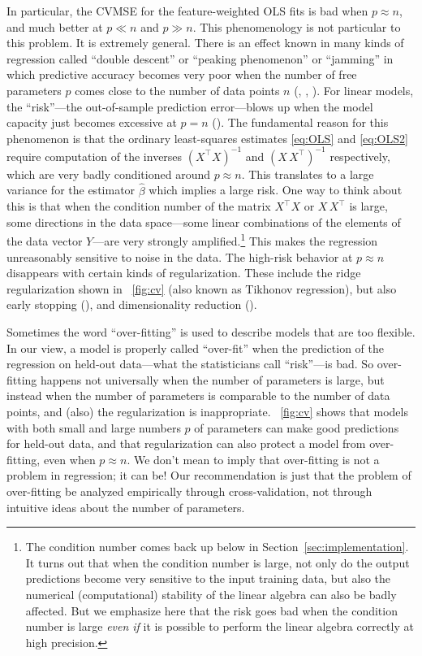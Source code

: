 \documentclass[12pt,letterpaper]{article}
\newcommand{\sectionname}{Section}
\begin{document}
In particular, the CVMSE for the feature-weighted OLS fits is bad when $p\approx n$, and much better at $p\ll n$ and $p \gg n$.
This phenomenology is not particular to this problem.
It is extremely general.
There is an effect known in many kinds of regression called ``double descent'' or ``peaking phenomenon'' or ``jamming'' in which predictive accuracy becomes very poor when the number of free parameters $p$ comes close to the number of data points $n$ (\citealt{jain198239}, \citealt{spigler2018jamming}, \citealt{geiger2019jamming}). For linear models, the ``risk''---the out-of-sample prediction error---blows up when the model capacity just becomes excessive at $p=n$ (\citealt{hastie2019surprises}).
The fundamental reason for this phenomenon is that the ordinary least-squares estimates \eqref{eq:OLS} and \eqref{eq:OLS2} require computation of the inverses $(X^\top X)^{-1}$ and $(X\,X^\top)^{-1}$ respectively, which are very badly conditioned around $p\approx n$.
This translates to a large variance for the estimator $\hat \beta$ which implies a large risk.
One way to think about this is that when the condition number of the matrix $X^\top X$ or $X\,X^\top$ is large, some directions in the data space---some linear combinations of the elements of the data vector $Y$---are very strongly amplified.\footnote{The condition number comes back up below in \sectionname~\ref{sec:implementation}. It turns out that when the condition number is large, not only do the output predictions become very sensitive to the input training data, but also the numerical (computational) stability of the linear algebra can also be badly affected. But we emphasize here that the risk goes bad when the condition number is large \emph{even if} it is possible to perform the linear algebra correctly at high precision.}
This makes the regression unreasonably sensitive to noise in the data.
The high-risk behavior at $p\approx n$ disappears with certain kinds of regularization.
These include the ridge regularization shown in \figurename~\ref{fig:cv} (also known as Tikhonov regression), but also early stopping (\citealt{hastie2019surprises}), and dimensionality reduction (\citealt{huang2020dimensionality}).

Sometimes the word ``over-fitting'' is used to describe models that are too flexible.
In our view, a model is properly called ``over-fit'' when the prediction of the regression on held-out data---what the statisticians call ``risk''---is bad.
So over-fitting happens not universally when the number of parameters is large, but instead when the number of parameters is comparable to the number of data points, and (also) the regularization is inappropriate.
\figurename~\ref{fig:cv} shows that models with both small and large numbers $p$ of parameters can make good predictions for held-out data, and that regularization can also protect a model from over-fitting, even when $p\approx n$.
We don't mean to imply that over-fitting is not a problem in regression; it can be!
Our recommendation is just that the problem of over-fitting be analyzed empirically through cross-validation, not through intuitive ideas about the number of parameters.
\end{document}
